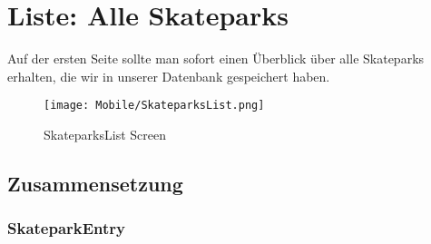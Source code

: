 \section{Liste: Alle Skateparks}
Auf der ersten Seite sollte man sofort einen Überblick über alle Skateparks erhalten, die wir in
unserer Datenbank gespeichert haben.

\begin{figure}[H]
  \begin{center}
    \texttt{[image: Mobile/SkateparksList.png]}
    \caption{SkateparksList Screen}
  \end{center}
\end{figure}

\subsection{Zusammensetzung}
\subsubsection{SkateparkEntry}
